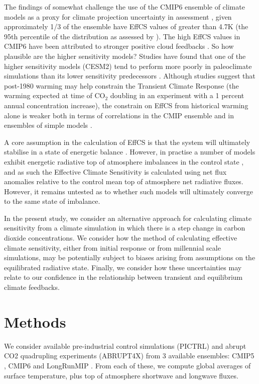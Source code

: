\documentclass[esd, article]{copernicus}
\begin{document}
The findings of \cite{sherwood2020assessment} somewhat challenge the use of the CMIP6 ensemble of climate models \citep{eyring2016overview} as a proxy for climate projection uncertainty in assessment \citep{o2016scenario}, given approximately 1/3 of the ensemble \citep{meehl2020context} have EffCS values of greater than  4.7K (the 95th percentile of the distribution as assessed by \cite{sherwood2014spread}).  The high EffCS values in CMIP6 have been attributed to stronger positive cloud feedbacks \cite{zelinka2020causes}.  
So how plausible are the higher sensitivity models?  Studies have found that one of the higher sensitivity models (CESM2) tend to perform more poorly in paleoclimate simulations than its lower sensitivity predecessors \citep{zhu2020high}.  Although studies \citep{nijsse2020emergent,tokarska2020past} suggest that post-1980 warming may help constrain the Transient Climate Response (the warming expected at time of CO$_2$ doubling in an experiment with a 1 percent annual concentration increase), the constrain on EffCS from historical warming alone is weaker both in terms of correlations in the CMIP ensemble \cite{tokarska2018cumulative} and in ensembles of simple models \cite{sanderson2020relating,sherwood2020assessment}.

A core assumption in the calculation of EffCS is that the system will ultimately stabilise in a state of energetic balance \cite{gregory2004new}.  However, in practise a number of models exhibit energetic radiative top of atmosphere imbalances in the control state \cite{rugenstein2019longrunmip}, and as such the Effective Climate Sensitivity is calculated using net flux anomalies relative to the control mean top of atmosphere net radiative fluxes.  However, it remains untested as to whether such models will ultimately converge to the same state of imbalance.

In the present study, we consider an alternative approach for calculating climate sensitivity from a climate simulation in which there is a step change in carbon dioxide concentrations.  We consider how the method of calculating effective climate sensitivity, either from initial response or from millennial scale simulations, may be potentially subject to biases arising from assumptions on the equilibrated radiative state.  Finally, we consider how these uncertainties may relate to our confidence in the relationship between transient and equilibrium climate feedbacks.

\section{Methods}
\label{sec_methods}
We consider available pre-industrial control simulations (PICTRL) and abrupt CO2 quadrupling experiments (ABRUPT4X) from 3 available ensembles: CMIP5 \citep{taylor2012overview}, CMIP6 \citep{eyring2016overview} and LongRunMIP \cite{rugenstein2019longrunmip}.  From each of these, we compute global averages of surface temperature, plus top of atmosphere shortwave and longwave fluxes.
\end{document}

